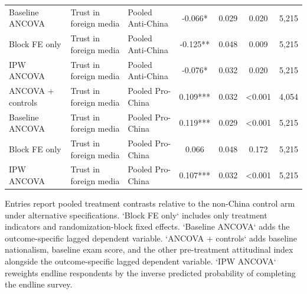 \begin{table}[H]
\begin{threeparttable}
\begin{tabular}{lllcccc}
Baseline ANCOVA & Trust in foreign media & Pooled Anti-China & -0.066* & 0.029 & 0.020 & 5,215 \\
Block FE only & Trust in foreign media & Pooled Anti-China & -0.125** & 0.048 & 0.009 & 5,215 \\
IPW ANCOVA & Trust in foreign media & Pooled Anti-China & -0.076* & 0.032 & 0.020 & 5,215 \\
ANCOVA + controls & Trust in foreign media & Pooled Pro-China & 0.109*** & 0.032 & <0.001 & 4,054 \\
Baseline ANCOVA & Trust in foreign media & Pooled Pro-China & 0.119*** & 0.029 & <0.001 & 5,215 \\
Block FE only & Trust in foreign media & Pooled Pro-China & 0.066 & 0.048 & 0.172 & 5,215 \\
IPW ANCOVA & Trust in foreign media & Pooled Pro-China & 0.107*** & 0.032 & <0.001 & 5,215 \\
\bottomrule
\end{tabular}
\begin{tablenotes}[flushleft]
\footnotesize
\item Entries report pooled treatment contrasts relative to the non-China control arm under alternative specifications. `Block FE only` includes only treatment indicators and randomization-block fixed effects. `Baseline ANCOVA` adds the outcome-specific lagged dependent variable. `ANCOVA + controls` adds baseline nationalism, baseline exam score, and the other pre-treatment attitudinal index alongside the outcome-specific lagged dependent variable. `IPW ANCOVA` reweights endline respondents by the inverse predicted probability of completing the endline survey.
\end{tablenotes}
\end{threeparttable}
\end{table}
